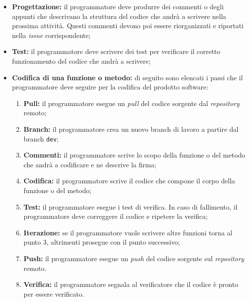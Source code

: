 \begin{itemize}
	\item \textbf{Progettazione:} il programmatore deve produrre dei commenti o
	      degli appunti che descrivano la struttura del codice che andrà a
	      scrivere nella prossima attività. Questi commenti devono poi essere
	      riorganizzati e riportati nella \textit{issue} corrispondente;

	\item \textbf{Test:} il programmatore deve scrivere dei test per verificare
	      il corretto funzionamento del codice che andrà a scrivere;

	\item \textbf{Codifica di una funzione o metodo:} di seguito sono elencati i
	      passi che il programmatore deve seguire per la codifica del prodotto
	      software:
	      \begin{enumerate}
		      \item \textbf{Pull:} il programmatore esegue un \textit{pull} del
		            codice sorgente dal \textit{repository} remoto;

		      \item \textbf{Branch:} il programmatore crea un nuovo branch di
		            lavoro a partire dal branch \texttt{dev};

		      \item \textbf{Commenti:} il programmatore scrive lo scopo della
		            funzione o del metodo che andrà a codificare e ne descrive
		            la firma;

		      \item \textbf{Codifica:} il programmatore scrive il codice che
		            compone il corpo della funzione o del metodo;

		      \item \textbf{Test:} il programmatore esegue i test di verifica.
		            In caso di fallimento, il programmatore deve correggere il
		            codice e ripetere la verifica;

		      \item \textbf{Iterazione:} se il programmatore vuole scrivere
		            altre funzioni torna al punto 3, altrimenti prosegue
		            con il punto successivo;

		      \item \textbf{Push:} il programmatore esegue un \textit{push}
		            del codice sorgente sul \textit{repository} remoto.

		      \item \textbf{Verifica:} il programmatore segnala al
		            verificatore che il codice è pronto per essere verificato.


\end{enumerate}
\end{itemize}
